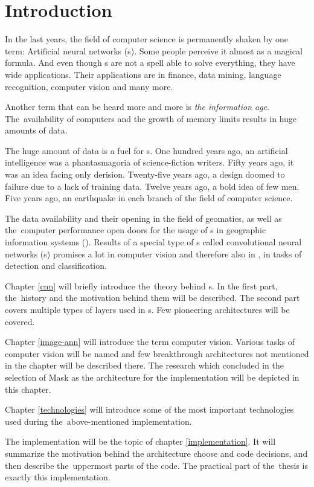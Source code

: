 \chapter{Introduction}
\label{intro}

In the last years, the field of computer science is permanently shaken by one 
term: Artificial neural networks (s). Some people perceive it almost
as a magical formula. And even though s are not a spell able to solve
everything, they have wide applications. Their applications are in finance,
data mining, language recognition, computer vision and many more.

Another term that can be heard more and more is \textit{the information age}.
The~availability of computers and the growth of memory limits results in huge
amounts of data.

The huge amount of data is a fuel for s. One hundred years ago, an
artificial intelligence was a phantasmagoria of science-fiction writers. Fifty
years ago, it was an idea facing only derision. Twenty-five years ago, a design
doomed to failure due to a lack of training data. Twelve years ago, a bold idea
of few men. Five years ago, an earthquake in each branch of the field of
computer science.

The data availability and their opening in the field of geomatics, as well as
the~computer performance open doors for the usage of s in geographic
information systems (). Results of a special type of s called
convolutional neural networks (s) promises a lot in computer vision and
therefore also in , in tasks of detection and classification.

Chapter \ref{cnn} will briefly introduce the~theory behind s. In the
first part, the~history and the motivation behind them will be described. The
second part covers multiple types of layers used in s. Few pioneering
architectures will be covered.

Chapter \ref{image-ann} will introduce the term computer vision. Various tasks
of computer vision will be named and few breakthrough architectures not 
mentioned in the  chapter will be described there. The research which 
concluded in the selection of Mask  as the architecture for the 
implementation will be depicted in this chapter.

Chapter \ref{technologies} will introduce some of the most important 
technologies used during
the~above-mentioned implementation.

The implementation will be the topic of chapter \ref{implementation}. It will 
summarize the motivation behind the architecture choose and code decisions, and
then describe the~uppermost parts of the code. The practical part of the~thesis
is exactly this implementation.
